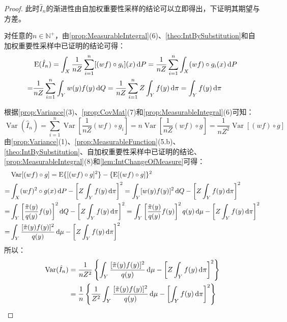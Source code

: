 \begin{proof}
	此时$\hat{I}_n$的渐进性由自加权重要性采样的结论可以立即得出，下证明其期望与方差。\par
	对任意的$n\in\mathbb{N}^+$，由\cref{prop:MeasurableIntegral}(6)、\cref{theo:IntBySubstitution}和自加权重要性采样中已证明的结论可得：
	\begin{align*}
		&\operatorname{E}(\hat{I}_n)=\int_{X}\frac{1}{nZ}\sum_{i=1}^{n}[(wf)\circ g_i](x)\mathop{}\!\mathrm{d} P=\frac{1}{nZ}\sum_{i=1}^{n}\int_{X}(wf)\circ g_i(x)\mathop{}\!\mathrm{d} P \\
		=&\frac{1}{nZ}\sum_{i=1}^{n}\int_{Y}w(y)f(y)\mathop{}\!\mathrm{d} Q=\frac{1}{nZ}\sum_{i=1}^{n}Z\int_{Y}f(y)\mathop{}\!\mathrm{d}\pi=\int_{Y}f(y)\mathop{}\!\mathrm{d}\pi
	\end{align*}\par
	根据\cref{prop:Variance}(3)、\cref{prop:CovMat}(7)和\cref{prop:MeasurableIntegral}(6)可知：
	\begin{equation*}
		\operatorname{Var}(\hat{I}_n)=\sum_{i=1}^{n}\operatorname{Var}\left[\frac{1}{nZ}(wf)\circ g_i\right]=n\operatorname{Var}\left[\frac{1}{nZ}(wf)\circ g\right]=\frac{1}{nZ^2}\operatorname{Var}[(wf)\circ g]
	\end{equation*}
	由\cref{prop:Variance}(1)、\cref{prop:MeasurableFunction}(5.b)、\cref{theo:IntBySubstitution}、自加权重要性采样中已证明的结论、\cref{prop:MeasurableIntegral}(8)和\cref{lem:IntChangeOfMeasure}可得：
	\begin{align*}
		&\operatorname{Var}[(wf)\circ g]=\operatorname{E}\{[(wf)\circ g]^2\}-\{\operatorname{E}[(wf)\circ g]\}^2 \\
		=&\int_{X}(wf)^2\circ g(x)\dif P-\left[Z\int_{Y}f(y)\dif\pi\right]^2=\int_{Y}[w(y)f(y)]^2\dif Q-\left[Z\int_{Y}f(y)\dif\pi\right]^2 \\
		=&\int_{Y}\left[\frac{\tilde{\pi}(y)}{q(y)}f(y)\right]^2\dif Q-\left[Z\int_{Y}f(y)\dif\pi\right]^2=\int_{Y}\left[\frac{\tilde{\pi}(y)}{q(y)}f(y)\right]^2q(y)\dif\mu-\left[Z\int_{Y}f(y)\dif\pi\right]^2 \\
		=&\int_{Y}\frac{[\tilde{\pi}(y)f(y)]^2}{q(y)}\dif\mu-\left[Z\int_{Y}f(y)\dif\pi\right]^2
	\end{align*}
	所以：
	\begin{align*}
		\operatorname{Var}(\hat{I}_n)&=\frac{1}{nZ^2}\left\{\int_{Y}\frac{[\tilde{\pi}(y)f(y)]^2}{q(y)}\mathop{}\!\mathrm{d}\mu-\left[Z\int_{Y}f(y)\mathop{}\!\mathrm{d}\pi\right]^2\right\} \\
		&=\frac{1}{n}\left\{\frac{1}{Z^2}\int_{Y}\frac{[\tilde{\pi}(y)f(y)]^2}{q(y)}\mathop{}\!\mathrm{d}\mu-\left[\int_{Y}f(y)\mathop{}\!\mathrm{d}\pi\right]^2\right\}
	\end{align*}\par

\end{proof}

